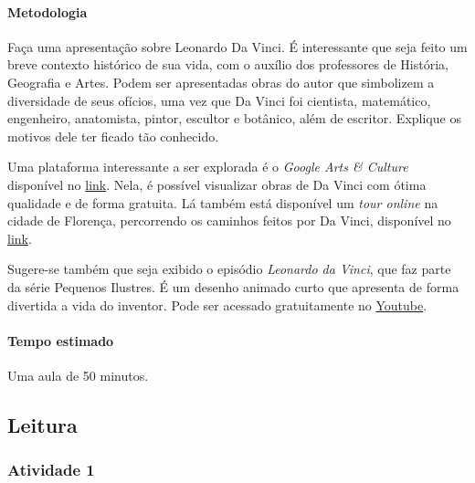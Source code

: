 \documentclass[11pt]{extarticle}
\begin{document}

\paragraph{Metodologia} Faça uma apresentação sobre Leonardo Da Vinci. É interessante que seja feito um breve contexto histórico de sua vida, com o auxílio dos professores de História, Geografia e Artes. Podem ser apresentadas obras do autor que simbolizem a diversidade de seus ofícios, uma vez que Da Vinci foi cientista, matemático, engenheiro, anatomista, pintor, escultor e botânico, além de escritor. Explique os motivos dele ter ficado tão conhecido.

Uma plataforma interessante a ser explorada é o \textit{Google Arts \& Culture} disponível no \href{https://artsandculture.google.com/entity/\%2Fm\%2F04lg6?hl=pt-BR\&col=RGB_0E182D}{link}. Nela, é possível visualizar obras de Da Vinci com ótima qualidade e de forma gratuita. Lá também está disponível um \textit{tour online} na cidade de Florença, percorrendo os caminhos feitos por Da Vinci, disponível no \href{https://artsandculture.google.com/story/sQURHljckUgVZQ?hl=pt-BR}{link}.

Sugere-se também que seja exibido o episódio \textit{Leonardo da Vinci}, que faz parte da série Pequenos Ilustres. É um desenho animado curto que apresenta de forma divertida a vida do inventor. Pode ser acessado gratuitamente no \href{https://youtu.be/0hwJzpATtjg}{Youtube}.

\paragraph{Tempo estimado} Uma aula de 50 minutos.

\subsection{Leitura}

\subsubsection{Atividade 1}

\end{document}
